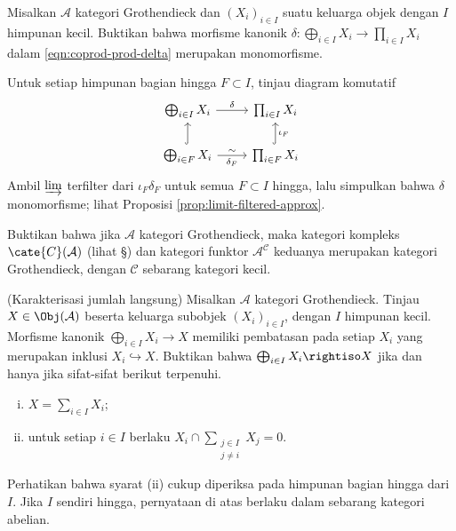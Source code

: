 \begin{Exercises}
	\item Misalkan $\mathcal{A}$ kategori Grothendieck dan
	$(X_i)_{i\in I}$ suatu keluarga objek dengan $I$ himpunan kecil. Buktikan
	bahwa morfisme kanonik
	$\delta:\bigoplus_{i\in I}X_i\to\prod_{i\in I}X_i$ dalam
	\eqref{eqn:coprod-prod-delta} merupakan monomorfisme.

	\begin{hint}
		Untuk setiap himpunan bagian hingga $F\subset I$, tinjau diagram komutatif
		\[\begin{tikzcd}
			\bigoplus_{i \in I} X_i \arrow[r, "\delta"] & \prod_{i \in I} X_i \\
			\bigoplus_{i \in F} X_i \arrow[r, "\sim", "\delta_F"'] \arrow[hookrightarrow, u] & \prod_{i \in F} X_i \arrow[hookrightarrow, u, "{\iota_F}"']
		\end{tikzcd}\]
		Ambil $\varinjlim$ terfilter dari
		$\iota_F\delta_F$ untuk semua $F\subset I$ hingga, lalu simpulkan bahwa
		$\delta$ monomorfisme; lihat Proposisi
		\ref{prop:limit-filtered-approx}.
	\end{hint}

	\item Buktikan bahwa jika $\mathcal{A}$ kategori Grothendieck, maka kategori
	kompleks $\cate{C}(\mathcal{A})$ (lihat
	\S{}) dan kategori funktor
	$\mathcal{A}^{\mathcal{C}}$ keduanya merupakan kategori Grothendieck, dengan
	$\mathcal{C}$ sebarang kategori kecil.

	\item (Karakterisasi jumlah langsung) Misalkan $\mathcal{A}$ kategori
	Grothendieck. Tinjau $X\in\Obj(\mathcal{A})$ beserta keluarga subobjek
	$(X_i)_{i\in I}$, dengan $I$ himpunan kecil. Morfisme kanonik
	$\bigoplus_{i\in I}X_i\to X$ memiliki pembatasan pada setiap $X_i$ yang
	merupakan inklusi
	$X_i\hookrightarrow X$. Buktikan bahwa
	$\bigoplus_{i\in I}X_i\rightiso X$ jika dan hanya jika sifat-sifat berikut
	terpenuhi.
	\begin{enumerate}[(i)]
		\item $X=\sum_{i\in I}X_i$;
		\item untuk setiap $i\in I$ berlaku
		$X_i\cap\sum_{\substack{j\in I\\j\neq i}}X_j=0$.
	\end{enumerate}
	Perhatikan bahwa syarat (ii) cukup diperiksa pada himpunan bagian hingga
	dari $I$. Jika $I$ sendiri hingga, pernyataan di atas berlaku dalam sebarang
	kategori abelian.


\end{Exercises}
